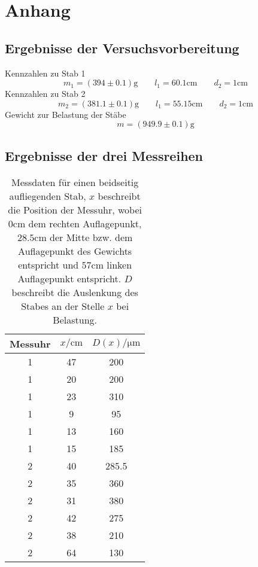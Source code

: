 \section{Anhang}
\label{sec:anhang}

\subsection{Ergebnisse der Versuchsvorbereitung}
Kennzahlen zu Stab 1
\begin{equation}
	m_1 = (394 \pm 0.1) \si{\gram}
	\qquad
	l_1 = 60.1 \si{\centi\meter}
	\qquad
	d_2 = 1 \si{\centi\meter}
\end{equation}
Kennzahlen zu Stab 2
\begin{equation}
	m_2 = (381.1 \pm 0.1) \si{\gram}
	\qquad
	l_1 = 55.15 \si{\centi\meter}
	\qquad
	d_2 = 1 \si{\centi\meter}
\end{equation}
Gewicht zur Belastung der Stäbe
\begin{equation}
	m = (949.9 \pm 0.1) \si{\gram}
\end{equation}

\newpage
\subsection{Ergebnisse der drei Messreihen}
\begin{table}
	\centering
	\caption{Messdaten für einen beidseitig aufliegenden Stab, $x$ beschreibt
	die Position der Messuhr, wobei $0\si{\centi\meter}$
	dem rechten Auflagepunkt, $28.5\si{\centi\meter}$ der Mitte bzw. dem Auflagepunkt 
	des Gewichts entspricht und $57\si{\centi\meter}$ linken Auflagepunkt entspricht.
	$D$ beschreibt die Auslenkung des Stabes an der Stelle $x$ bei Belastung.}
	\begin{tabular}{c c c}
	\toprule
	Messuhr &
	$x / \si{\centi\meter}$ &
	$D(x) / \si{\micro\meter}$
	\\
	\midrule
	1 & 47 & 200 \\
	1 & 20 & 200 \\
	1 & 23 & 310 \\
	1 & 9 & 95 \\
	1 & 13 & 160 \\
	1 & 15 & 185 \\
	2 & 40 & 285.5 \\
	2 & 35 & 360 \\
	2 & 31 & 380 \\
	2 & 42 & 275 \\
	2 & 38 & 210 \\
	2 & 64 & 130 \\
	\bottomrule
\end{tabular}
\end{table}

